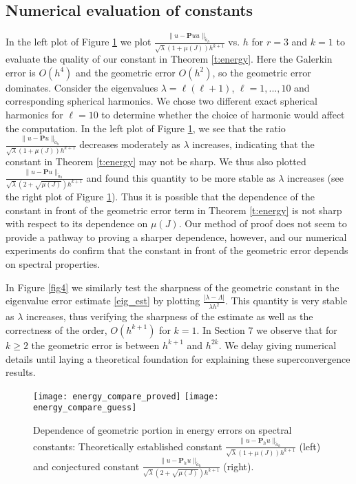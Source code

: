 \documentclass{siamart0516}
\newcommand{\Ek}{\mathbf{P}_{h}}
\newcommand{\ak}{\tilde{a}_h}
\newcommand{\bP}{\ensuremath{\boldsymbol P}}
\numberwithin{equation}{section}
\numberwithin{theorem}{section}
\numberwithin{figure}{section}
\begin{document}
\subsection{Numerical evaluation of constants}\label{ss:numeric_constant}
In the left plot of Figure \ref{fig3} we plot $\frac{\|u-\bP u u\|_{\ak}}{\sqrt{\lambda}(1+\mu(J))h^{k+1}}$ vs. $h$ for $r=3$ and $k=1$ to evaluate the quality of our constant in Theorem \ref{t:energy}.  Here the Galerkin error is $O(h^4)$ and the geometric error $O(h^2)$, so the geometric error dominates.  Consider the eigenvalues $\lambda=\ell (\ell+1)$, $\ell=1,..., 10$ and corresponding spherical harmonics.  We chose two different exact spherical harmonics for $\ell=10$ to determine whether the choice of harmonic would affect the computation.  In the left plot of Figure \ref{fig3}, we see that the ratio $\frac{\|u-\bP u\|_{\ak}}{\sqrt{\lambda}(1+\mu(J))h^{k+1}}$ decreases moderately as $\lambda$ increases, indicating that the constant in Theorem \ref{t:energy} may not be sharp.  We thus also plotted $\frac{\|u-\bP u\|_{\ak}}{\sqrt{\lambda}(2+\sqrt{\mu(J)})h^{k+1}}$ and found this quantity to be more stable as $\lambda$ increases (see the right plot of Figure \ref{fig3}).  Thus it is possible that the dependence of the constant in front of the geometric error term in Theorem \ref{t:energy} is not sharp with respect to its dependence on $\mu(J)$. Our method of proof does not seem to provide a pathway to proving a sharper dependence, however, and our numerical experiments do confirm that the constant in front of the geometric error depends on spectral properties.  

In Figure \ref{fig4} we similarly test the sharpness of the geometric constant in the eigenvalue error estimate \eqref{eig_est} by plotting $\frac{|\lambda-\Lambda|}{\lambda h^2}$. This quantity is very stable as $\lambda$ increases, thus verifying the sharpness of the estimate as well as the correctness of the order, $O(h^{k+1})$ for $k=1$. In Section 7 we observe that for $k\geq 2$ the geometric error is between $h^{k+1}$ and $h^{2k}$. We delay giving numerical details until laying a theoretical foundation for explaining these superconvergence results. 

\setlength{\unitlength}{.75cm}
\begin{figure}[h]
\centering
\texttt{[image: energy\_compare\_proved]}
\texttt{[image: energy\_compare\_guess]}
\caption{Dependence of geometric portion in energy errors on spectral constants:  Theoretically established constant $\frac{\|u-\Ek u\|_{\ak}}{\sqrt{\lambda}(1+\mu(J))h^{k+1}}$ (left) and conjectured constant $\frac{\|u-\Ek u\|_{\ak}}{\sqrt{\lambda}(2+\sqrt{\mu(J)})h^{k+1}}$ (right).}
\label{fig3}
\end{figure}
\end{document}
